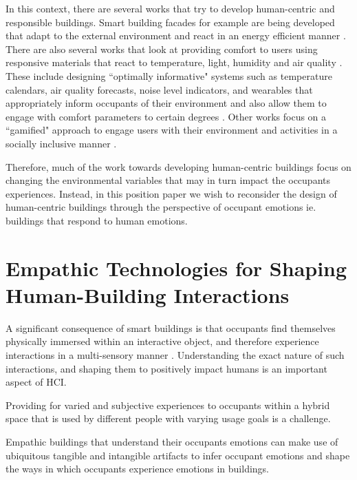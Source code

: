 \documentclass[manuscript, anonymous, review]{acmart}
\begin{document}
In this context, there are several works that try to develop human-centric and responsible buildings. Smart building facades for example are being developed that adapt to the external environment and react in an energy efficient manner \cite{ahmed2015development}. There are also several works that look at providing comfort to users using responsive materials that react to temperature, light, humidity and air quality \cite{fragkia2020exergy, holstov2015hygromorphic, kroner1997intelligent}. These include designing ``optimally informative" systems such as temperature calendars, air quality forecasts, noise level indicators, and wearables that appropriately inform occupants of their environment and also allow them to engage with comfort parameters to certain degrees  \cite{costanza2016bit, milenkovic2013improving, kim2020designing}. Other works focus on a ``gamified" approach to engage users with their environment and activities in a socially inclusive manner \cite{mathur2015tiny, kwallek1997impact, zhong2022augmenting}. 

Therefore, much of the work towards developing human-centric buildings focus on changing the environmental variables that may in turn impact the occupants experiences. Instead, in this position paper we wish to reconsider the design of human-centric buildings through the perspective of occupant emotions ie. buildings that respond to human emotions.


\section{Empathic Technologies for Shaping Human-Building Interactions}

A significant consequence of smart buildings is that occupants find themselves physically immersed within an interactive object, and therefore experience interactions in a multi-sensory manner \cite{nembrini2017human}. Understanding the exact nature of such interactions, and shaping them to positively impact humans is an important aspect of HCI.   

Providing for varied and subjective experiences to occupants within a hybrid space that is used by different people with varying usage goals is a challenge. 

Empathic buildings that understand their occupants emotions can make use of ubiquitous tangible and intangible artifacts to infer occupant emotions and shape the ways in which occupants experience emotions in buildings.
\end{document}
